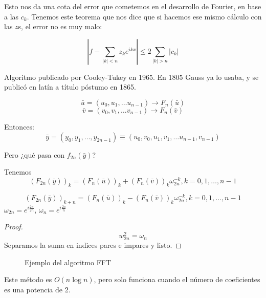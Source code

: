 			Esto nos da una cota del error que cometemos en el desarrollo de Fourier, en base a las $c_k$. Tenemos este teorema que nos dice que si hacemos ese mismo cálculo con las $z$s, el error no es muy malo:

			\begin{theorem}
				\[ \left| f - \sum_{|k|< n} z_k e^{ikx}  \right| \leq 2 \sum_{|k| > n } |c_k| \]
			\end{theorem}


			\obs Algoritmo publicado por Cooley-Tukey en 1965. En 1805 Gauss ya lo usaba, y se publicó en latín a título póstumo en 1865.

			\[ \bar{u} = (u_0, u_1, … u_{n-1}) \rightarrow F_n (\bar{u})  \]
			\[ \bar{v} = (v_0, v_1, … v_{n-1}) \rightarrow F_n (\bar{v})  \]

			Entonces:
			\[ \bar{y} = (y_0,y_1,…,y_{2n-1}) \equiv (u_0,v_0,u_1,v_1, … u_{n-1},v_{n-1})  \]

			Pero ¿qué pasa con $f_{2n}(\bar{y})$?

			Tenemos
			\[ \left(F_{2n} (\bar{y})\right)_k = \left(F_{n} (\bar{u})\right)_k + \left(F_{n} (\bar{v})\right)_k \omega_{2n}^{-k}, k=0,1,…,n-1 \]

			\[ \left(F_{2n} (\bar{y})\right)_{k+n} = \left(F_{n} (\bar{u})\right)_k - \left(F_{n} (\bar{v})\right)_k \omega_{2n}^{-k}, k=0,1,…,n-1 \]
			\obs $\omega_{2n} = e^{i\frac{2\pi}{2n}}$, $\omega_{n} = e^{i \frac{2\pi}{n}}$

			\begin{proof}
				\[ w_{2n}^2 = \omega_{n} \]
				Separamos la suma en indices pares e impares y listo.
			\end{proof}

			\begin{figure}[hbtp]
				\caption{Ejemplo del algoritmo FFT}
			\end{figure}

			Este método es $O(n \log n)$, pero solo funciona cuando el número de coeficientes es una potencia de 2.


